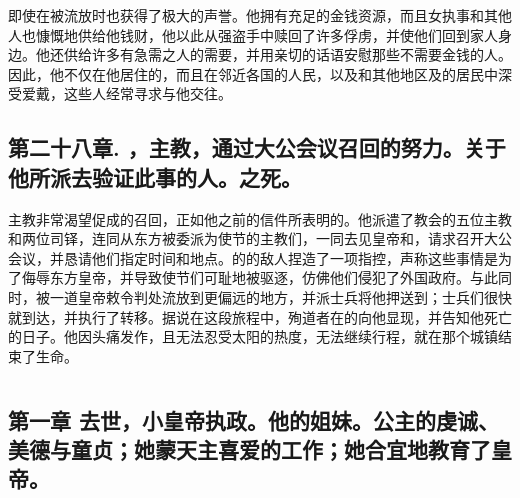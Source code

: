 即使在被流放时也获得了极大的声誉。他拥有充足的金钱资源，而且女执事和其他人也慷慨地供给他钱财，他以此从强盗手中赎回了许多俘虏，并使他们回到家人身边。他还供给许多有急需之人的需要，并用亲切的话语安慰那些不需要金钱的人。因此，他不仅在他居住的，而且在邻近各国的人民，以及和其他地区及的居民中深受爱戴，这些人经常寻求与他交往。\par


\subsection{第二十八章. ，主教，通过大公会议召回的努力。关于他所派去验证此事的人。之死。}

主教非常渴望促成的召回，正如他之前的信件所表明的。他派遣了教会的五位主教和两位司铎，连同从东方被委派为使节的主教们，一同去见皇帝和，请求召开大公会议，并恳请他们指定时间和地点。的的敌人捏造了一项指控，声称这些事情是为了侮辱东方皇帝，并导致使节们可耻地被驱逐，仿佛他们侵犯了外国政府。与此同时，被一道皇帝敕令判处流放到更偏远的地方，并派士兵将他押送到；士兵们很快就到达，并执行了转移。据说在这段旅程中，殉道者在的向他显现，并告知他死亡的日子。他因头痛发作，且无法忍受太阳的热度，无法继续行程，就在那个城镇结束了生命。\par



\section{}


\subsection{第一章\newline{} 去世，小皇帝执政。他的姐妹。公主的虔诚、美德与童贞；她蒙天主喜爱的工作；她合宜地教育了皇帝。}

